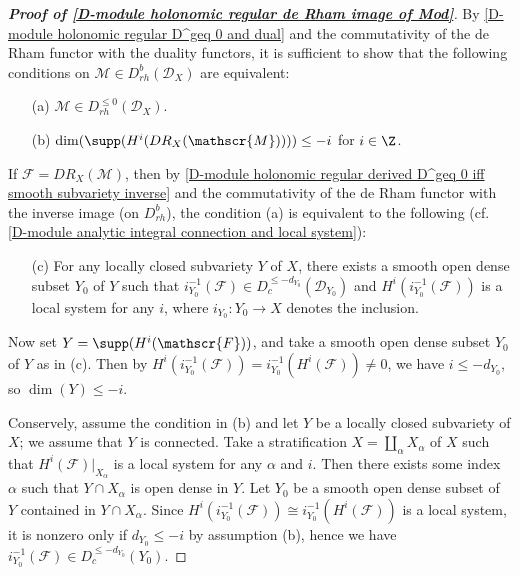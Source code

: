 \begin{proof}[\textbf{Proof of \cref{D-module holonomic regular de Rham image of Mod}}]
By \cref{D-module holonomic regular D^geq 0 and dual} and the commutativity of the de Rham functor with the duality functors, it is sufficient to show that the following conditions on $\mathscr{M}\in D^b_{rh}(\mathscr{D}_X)$ are equivalent:
\begin{enumerate}
    \item[(a)] $\mathscr{M}\in D^{\leq 0}_{rh}(\mathscr{D}_X)$.
    \item[(b)] $\dim(\supp(H^i(DR_X(\mathscr{M}))))\leq -i$ for $i\in\Z$.
\end{enumerate}
If $\mathscr{F}=DR_X(\mathscr{M})$, then by \cref{D-module holonomic regular derived D^geq 0 iff smooth subvariety inverse} and the commutativity of the de Rham functor with the inverse image (on $D^b_{rh}$), the condition (a) is equivalent to the following (cf. \cref{D-module analytic integral connection and local system}):
\begin{enumerate}
    \item[(c)] For any locally closed subvariety $Y$ of $X$, there exists a smooth open dense subset $Y_0$ of $Y$ such that $i_{Y_0}^{-1}(\mathscr{F})\in D^{\leq -d_{Y_0}}_c(\mathscr{D}_{Y_0})$ and $H^i(i_{Y_0}^{-1}(\mathscr{F}))$ is a local system for any $i$, where $i_{Y_0}:Y_0\to X$ denotes the inclusion.
\end{enumerate}
Now set $Y=\supp(H^i(\mathscr{F}))$, and take a smooth open dense subset $Y_0$ of $Y$ as in (c). Then by $H^i(i_{Y_0}^{-1}(\mathscr{F}))=i_{Y_0}^{-1}(H^i(\mathscr{F}))\neq 0$, we have $i\leq -d_{Y_0}$, so $\dim(Y)\leq-i$.\par
Conservely, assume the condition in (b) and let $Y$ be a locally closed subvariety of $X$; we assume that $Y$ is connected. Take a stratification $X=\coprod_\alpha X_\alpha$ of $X$ such that $H^i(\mathscr{F})|_{X_\alpha}$ is a local system for any $\alpha$ and $i$. Then there exists some index $\alpha$ such that $Y\cap X_\alpha$ is open dense in $Y$. Let $Y_0$ be a smooth open dense subset of $Y$ contained in $Y\cap X_\alpha$. Since $H^i(i_{Y_0}^{-1}(\mathscr{F}))\cong i_{Y_0}^{-1}(H^i(\mathscr{F}))$ is a local system, it is nonzero only if $d_{Y_0}\leq -i$ by assumption (b), hence we have $i_{Y_0}^{-1}(\mathscr{F})\in D_c^{\leq -d_{Y_0}}(Y_0)$.
\end{proof}

